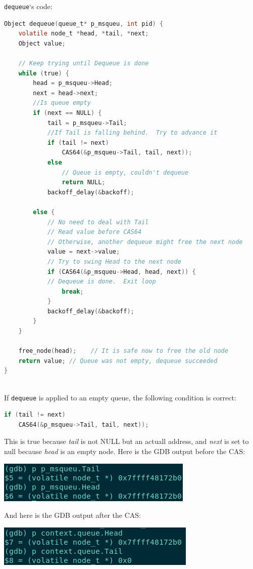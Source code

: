 \documentclass{article}
\begin{document}
\texttt{dequeue}`s code:

\begin{lstlisting}[language=C]
Object dequeue(queue_t* p_msqueu, int pid) {
	volatile node_t *head, *tail, *next;
	Object value;

	// Keep trying until Dequeue is done
	while (true) { 
		head = p_msqueu->Head; 
		next = head->next;
		//Is queue empty
		if (next == NULL) { 
			tail = p_msqueu->Tail; 
			//If Tail is falling behind.  Try to advance it
			if (tail != next)
				CAS64(&p_msqueu->Tail, tail, next));
			else
				// Queue is empty, couldn't dequeue
				return NULL; 
			backoff_delay(&backoff);

		else {
			// No need to deal with Tail
			// Read value before CAS64
			// Otherwise, another dequeue might free the next node
			value = next->value;
			// Try to swing Head to the next node
			if (CAS64(&p_msqueu->Head, head, next)) {
			// Dequeue is done.  Exit loop
				break;
			}
			backoff_delay(&backoff);
		}
	}

	free_node(head);	// It is safe now to free the old node
	return value; // Queue was not empty, dequeue succeeded
}
	
\end{lstlisting}

If \texttt{dequeue} is applied to an empty queue, the following condition is correct:

\begin{lstlisting}[language=C]
if (tail != next)
    CAS64(&p_msqueu->Tail, tail, next));
\end{lstlisting}

This is true because \textit{tail} is not NULL but an actuall address, and \textit{next} is set to null because \textit{head} is an empty node. Here is the GDB output before the CAS:

\includegraphics[width=\textwidth]{before-cas.png}

And here is the GDB output after the CAS:

\includegraphics[width=\textwidth]{after-cas.png}
\end{document}
